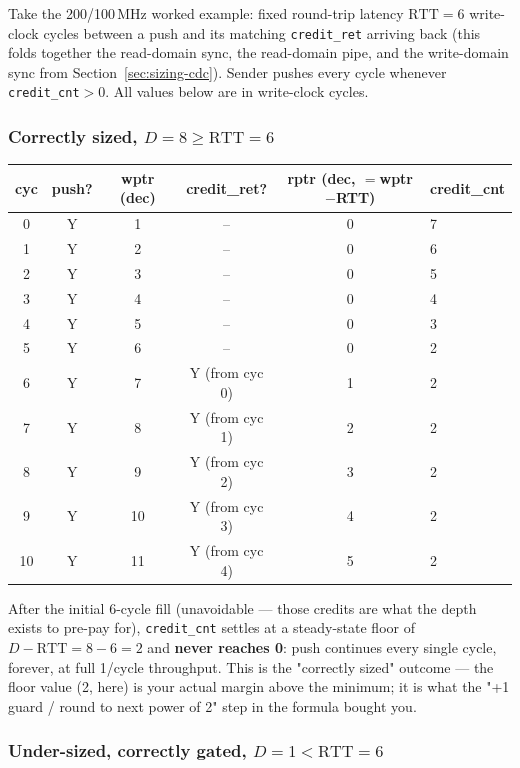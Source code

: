 \documentclass[12pt]{article}
\begin{document}
Take the 200/100\,MHz worked example: fixed round-trip latency
$\text{RTT}=6$ write-clock cycles between a push and its matching
\texttt{credit\_ret} arriving back (this folds together the read-domain
sync, the read-domain pipe, and the write-domain sync from
Section~\ref{sec:sizing-cdc}). Sender pushes every cycle whenever
\texttt{credit\_cnt}$>0$. All values below are in write-clock cycles.

\subsubsection{Correctly sized, $D=8 \geq \text{RTT}=6$}

\begin{center}\small
\renewcommand{\arraystretch}{1.05}
\begin{tabular}{cccccl}
\toprule
cyc & push? & wptr (dec) & credit\_ret? & rptr (dec, $=$wptr$-$RTT) & credit\_cnt \\
\midrule
0  & Y & 1  & -- & 0 & 7 \\
1  & Y & 2  & -- & 0 & 6 \\
2  & Y & 3  & -- & 0 & 5 \\
3  & Y & 4  & -- & 0 & 4 \\
4  & Y & 5  & -- & 0 & 3 \\
5  & Y & 6  & -- & 0 & 2 \\
6  & Y & 7  & Y (from cyc 0) & 1 & 2 \\
7  & Y & 8  & Y (from cyc 1) & 2 & 2 \\
8  & Y & 9  & Y (from cyc 2) & 3 & 2 \\
9  & Y & 10 & Y (from cyc 3) & 4 & 2 \\
10 & Y & 11 & Y (from cyc 4) & 5 & 2 \\
\bottomrule
\end{tabular}
\end{center}

After the initial 6-cycle fill (unavoidable — those credits are what the
depth exists to pre-pay for), \texttt{credit\_cnt} settles at a steady-state
floor of $D-\text{RTT}=8-6=2$ and \textbf{never reaches 0}: push continues
every single cycle, forever, at full 1/cycle throughput. This is the
"correctly sized" outcome — the floor value (2, here) is your actual margin
above the minimum; it is what the "+1 guard / round to next power of 2"
step in the formula bought you.

\subsubsection{Under-sized, correctly gated, $D=1 < \text{RTT}=6$}
\end{document}
